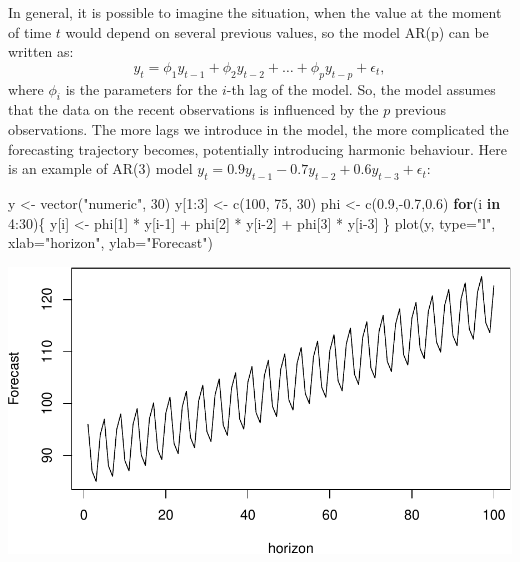 \documentclass[
]{book}
\newenvironment{Shaded}{\begin{snugshade}}{\end{snugshade}}
\newcommand{\AttributeTok}[1]{\textcolor[rgb]{0.77,0.63,0.00}{#1}}
\newcommand{\ControlFlowTok}[1]{\textcolor[rgb]{0.13,0.29,0.53}{\textbf{#1}}}
\newcommand{\DecValTok}[1]{\textcolor[rgb]{0.00,0.00,0.81}{#1}}
\newcommand{\FloatTok}[1]{\textcolor[rgb]{0.00,0.00,0.81}{#1}}
\newcommand{\FunctionTok}[1]{\textcolor[rgb]{0.00,0.00,0.00}{#1}}
\newcommand{\NormalTok}[1]{#1}
\newcommand{\OtherTok}[1]{\textcolor[rgb]{0.56,0.35,0.01}{#1}}
\newcommand{\SpecialCharTok}[1]{\textcolor[rgb]{0.00,0.00,0.00}{#1}}
\newcommand{\StringTok}[1]{\textcolor[rgb]{0.31,0.60,0.02}{#1}}
\theoremstyle{definition}
\theoremstyle{definition}
\theoremstyle{definition}
\theoremstyle{definition}
\theoremstyle{remark}
\begin{document}
In general, it is possible to imagine the situation, when the value at the moment of time \(t\) would depend on several previous values, so the model AR(p) can be written as:
\begin{equation}
  {y}_{t} = \phi_1 y_{t-1} + \phi_2 y_{t-2} + \dots + \phi_p y_{t-p} + \epsilon_t ,
  \label{eq:ARIMAp00Example}
\end{equation}
where \(\phi_i\) is the parameters for the \(i\)-th lag of the model. So, the model assumes that the data on the recent observations is influenced by the \(p\) previous observations. The more lags we introduce in the model, the more complicated the forecasting trajectory becomes, potentially introducing harmonic behaviour. Here is an example of AR(3) model \({y}_{t} = 0.9 y_{t-1} -0.7 y_{t-2} + 0.6 y_{t-3} + \epsilon_t\):

\begin{Shaded}
\begin{Highlighting}[]
\NormalTok{y }\OtherTok{\textless{}{-}} \FunctionTok{vector}\NormalTok{(}\StringTok{"numeric"}\NormalTok{, }\DecValTok{30}\NormalTok{)}
\NormalTok{y[}\DecValTok{1}\SpecialCharTok{:}\DecValTok{3}\NormalTok{] }\OtherTok{\textless{}{-}} \FunctionTok{c}\NormalTok{(}\DecValTok{100}\NormalTok{, }\DecValTok{75}\NormalTok{, }\DecValTok{30}\NormalTok{)}
\NormalTok{phi }\OtherTok{\textless{}{-}} \FunctionTok{c}\NormalTok{(}\FloatTok{0.9}\NormalTok{,}\SpecialCharTok{{-}}\FloatTok{0.7}\NormalTok{,}\FloatTok{0.6}\NormalTok{)}
\ControlFlowTok{for}\NormalTok{(i }\ControlFlowTok{in} \DecValTok{4}\SpecialCharTok{:}\DecValTok{30}\NormalTok{)\{}
\NormalTok{    y[i] }\OtherTok{\textless{}{-}}\NormalTok{ phi[}\DecValTok{1}\NormalTok{] }\SpecialCharTok{*}\NormalTok{ y[i}\DecValTok{{-}1}\NormalTok{] }\SpecialCharTok{+}\NormalTok{ phi[}\DecValTok{2}\NormalTok{] }\SpecialCharTok{*}\NormalTok{ y[i}\DecValTok{{-}2}\NormalTok{] }\SpecialCharTok{+}\NormalTok{ phi[}\DecValTok{3}\NormalTok{] }\SpecialCharTok{*}\NormalTok{ y[i}\DecValTok{{-}3}\NormalTok{]}
\NormalTok{\}}
\FunctionTok{plot}\NormalTok{(y, }\AttributeTok{type=}\StringTok{"l"}\NormalTok{, }\AttributeTok{xlab=}\StringTok{"horizon"}\NormalTok{, }\AttributeTok{ylab=}\StringTok{"Forecast"}\NormalTok{)}
\end{Highlighting}
\end{Shaded}

\includegraphics{adam_files/figure-latex/unnamed-chunk-47-1.pdf}
\end{document}
